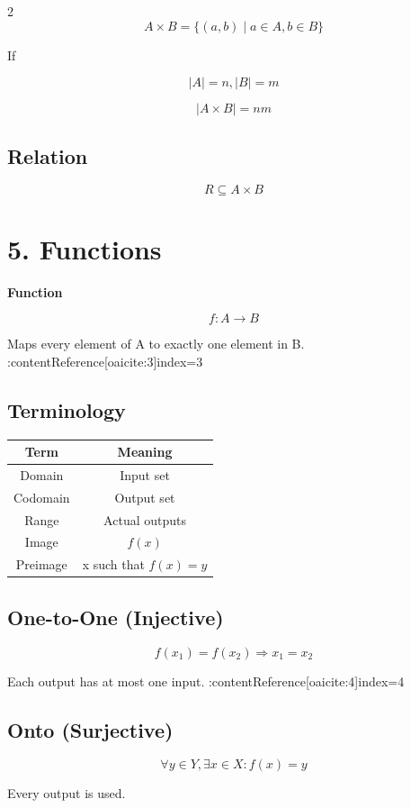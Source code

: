 \documentclass[10pt]{article}
\begin{document}
\begin{multicols}{2}
\[
A \times B = \{(a,b) \mid a \in A, b \in B\}
\]

If

\[
|A| = n, |B| = m
\]

\[
|A \times B| = nm
\]

\subsection*{Relation}

\[
R \subseteq A \times B
\]

\section*{5. Functions}

\textbf{Function}

\[
f : A \rightarrow B
\]

Maps every element of A to exactly one element in B. :contentReference[oaicite:3]{index=3}

\subsection*{Terminology}

\begin{tabular}{c|c}
Term & Meaning \\
\hline
Domain & Input set \\
Codomain & Output set \\
Range & Actual outputs \\
Image & $f(x)$ \\
Preimage & x such that $f(x)=y$
\end{tabular}

\subsection*{One-to-One (Injective)}

\[
f(x_1)=f(x_2) \Rightarrow x_1=x_2
\]

Each output has at most one input. :contentReference[oaicite:4]{index=4}

\subsection*{Onto (Surjective)}

\[
\forall y \in Y, \exists x \in X: f(x)=y
\]

Every output is used.


\end{multicols}
\end{document}
